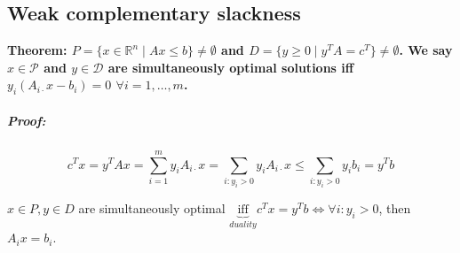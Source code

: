 \documentclass[main]{subfiles}
\begin{document}
\subsection{Weak complementary slackness}
\textbf{Theorem: $P = \{x \in \mathbb{R}^n \mid Ax \leq b \} \neq \emptyset$
and $D = \{ y \geq 0 \mid y^T A = c^T \} \neq \emptyset$. We say $x \in
\mathcal{P}$ and $y \in \mathcal{D}$ are simultaneously optimal solutions iff
$y_i (A_{i\cdot}x - b_i) = 0$ $\forall i = 1, \dots, m$. }

\subparagraph{Proof:}
\begin{equation} \label{eq:proof-weak-slackness}
c^T x = y^T Ax = \sum_{i=1}^{m} y_i A_{i\cdot} x = \sum_{i: y_i > 0} y_i A_{i
\cdot} x \leq \sum_{i: y_i > 0} y_i b_i = y^T b
\end{equation}

$x \in P, y \in D$ are simultaneously optimal $\underbrace{\text{iff}}_{duality} c^T x = y^T b \iff \forall i: y_i > 0$, then $A_i x = b_i$.
\end{document}
